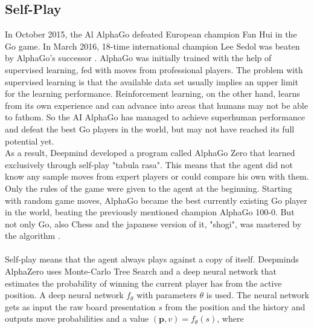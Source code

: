 \subsection{Self-Play}
\label{selfplay}

In October 2015, the Al AlphaGo defeated European champion Fan Hui in the Go game. In March 2016, 18-time international champion Lee Sedol was beaten by AlphaGo's successor \cite{GoalphaGosilver2017mastering}. 
AlphaGo was initially trained with the help of supervised learning, fed with moves from professional players.
The problem with supervised learning is that the available data set usually implies an upper limit for the learning performance. Reinforcement learning, on the other hand, learns from its own experience and can advance into areas that humans may not be able to fathom. So the AI AlphaGo has managed to achieve superhuman performance and defeat the best Go players in the world, but may not have reached its full potential yet.\\
As a result, Deepmind developed a program called AlphaGo Zero that learned exclusively through self-play "tabula rasa". This means that the agent did not know any sample moves from expert players or could compare his own with them. Only the rules of the game were given to the agent at the beginning. Starting with random game moves, AlphaGo became the best currently existing Go player in the world, beating the previously mentioned champion AlphaGo 100-0. But not only Go, also Chess and the japanese version of it, "shogi", was mastered by the algorithm \cite{chessSilver2017mastering,GoalphaGosilver2017mastering}. \\
\\
Self-play means that the agent always plays against a copy of itself.
Deepminds AlphaZero uses Monte-Carlo Tree Search \cite{montecarlobrowne2012survey} and a deep neural network that estimates the probability of winning the current player has from the active position.
A deep neural network $f_\theta$ with parameters $\theta$ is used. The neural network gets as input the raw board presentation $s$ from the position and the history and outputs move probabilities and a value $(\textbf{p}, v) = f_\theta (s)$, where

